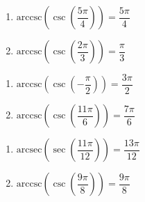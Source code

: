 \begin{multicols}{2}

\begin{enumerate}

\setcounter{enumi}{\value{HW}}

\item  $\text{arccsc}\left(\csc\left(\dfrac{5\pi}{4}\right) \right) = \dfrac{5\pi}{4}$
\item  $\text{arccsc}\left(\csc\left( \dfrac{2\pi}{3} \right) \right) = \dfrac{\pi}{3}$

\setcounter{HW}{\value{enumi}}

\end{enumerate}

\end{multicols}

\begin{multicols}{2}

\begin{enumerate}

\setcounter{enumi}{\value{HW}}

\item  $\text{arccsc}\left(\csc\left(-\dfrac{\pi}{2} \right) \right) = \dfrac{3\pi}{2}$ 
\item  $\text{arccsc}\left(\csc\left(\dfrac{11\pi}{6}\right) \right) = \dfrac{7\pi}{6}$

\setcounter{HW}{\value{enumi}}

\end{enumerate}

\end{multicols}

\begin{multicols}{2}

\begin{enumerate}

\setcounter{enumi}{\value{HW}}

\item  $\text{arcsec}\left(\sec\left(\dfrac{11\pi}{12}\right) \right) = \dfrac{13\pi}{12}$
\item  $\text{arccsc}\left(\csc\left(\dfrac{9\pi}{8}\right) \right) = \dfrac{9\pi}{8}$ 

\setcounter{HW}{\value{enumi}}

\end{enumerate}

\end{multicols}

